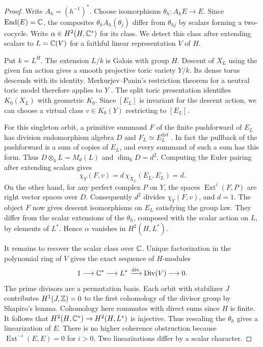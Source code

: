 \begin{proof}
Write $A_h=(h^{-1})^*$. Choose isomorphisms $\theta_h\colon A_hE\to E$. Since $\operatorname{End}(E)=\mathbb C$, the composites $\theta_h A_h(\theta_j)$ differ from $\theta_{hj}$ by scalars forming a two-cocycle. Write $\alpha\in H^2(H,\mathbb C^*)$ for its class. We detect this class after extending scalars to $L=\mathbb C(V)$ for a faithful linear representation $V$ of $H$.

Put $k=L^H$. The extension $L/k$ is Galois with group $H$. Descent of $X_L$ using the given fan action gives a smooth projective toric variety $Y/k$. Its dense torus descends with its identity. Merkurjev--Panin's restriction theorem for a neutral toric model therefore applies to $Y$ \cite[Corollaries~4.4 and~5.8, Proposition~5.6]{MP}. The split toric presentation identifies $K_0(X_L)$ with geometric $K_0$. Since $[E_L]$ is invariant for the descent action, we can choose a virtual class $v\in K_0(Y)$ restricting to $[E_L]$.

For this singleton orbit, a primitive summand $F$ of the finite pushforward of $E_L$ has division endomorphism algebra $D$ and $F_L\simeq E_L^{\oplus d}$ \cite[Proposition~2.14]{BDM}. In fact the pullback of the pushforward is a sum of copies of $E_L$, and every summand of such a sum has this form. Thus $D\otimes_k L=M_d(L)$ and $\dim_kD=d^2$. Computing the Euler pairing after extending scalars gives
\[
                        \chi_Y(F,v)=d\,\chi_{X_L}(E_L,E_L)=d.
\]
On the other hand, for any perfect complex $P$ on $Y$, the spaces $\operatorname{Ext}^i(F,P)$ are right vector spaces over $D$. Consequently $d^2$ divides $\chi_Y(F,v)$, and $d=1$. The object $F$ now gives descent isomorphisms on $E_L$ satisfying the group law. They differ from the scalar extensions of the $\theta_h$, composed with the scalar action on $L$, by elements of $L^*$. Hence $\alpha$ vanishes in $H^2(H,L^*)$.

It remains to recover the scalar class over $\mathbb C$. Unique factorization in the polynomial ring of $V$ gives the exact sequence of $H$-modules
\[
  1\longrightarrow\mathbb C^*\longrightarrow L^*
    \xrightarrow{\operatorname{div}}\operatorname{Div}(V)\longrightarrow 0 .
\]
The prime divisors are a permutation basis. Each orbit with stabilizer $J$ contributes $H^1(J,\mathbb Z)=0$ to the first cohomology of the divisor group by Shapiro's lemma. Cohomology here commutes with direct sums since $H$ is finite. It follows that $H^2(H,\mathbb C^*)\to H^2(H,L^*)$ is injective. Thus rescaling the $\theta_h$ gives a linearization of $E$. There is no higher coherence obstruction because $\operatorname{Ext}^{-i}(E,E)=0$ for $i>0$. Two linearizations differ by a scalar character.
\end{proof}


